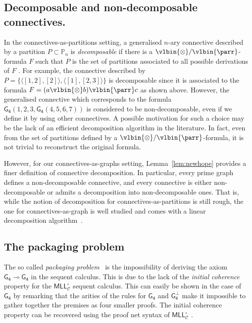 \documentclass{lmcs} %
\def\limp{\multimap}
\def\set#1{\{#1\}}
\def\cneg#1{{#1^\bot}}
\def\lpar{\vlbin{\parr}}
\def\ltens{\vlbin{\otimes}}
\def\MLL{\mathsf{MLL}}
\theoremstyle{plain}
\def\gcon{\mathsf{G_4}}
\def\ngcon{\mathsf{\cneg{G_4}}}
\def\partition#1{\langle #1\rangle}
\def\block#1{[#1]}
\def\partof#1{\mathbb P_{#1}}
\def\partofn{\partof n}
\def\MLLgen{\MLL^\circ_{\mathcal C}}
\begin{document}
\subsection*{Decomposable and non-decomposable connectives.}

In the connectives-as-partitions setting, a generalised $n$-ary connective described by a partition $P\subset\partofn$ is \emph{decomposable} if there is a $\ltens/\lpar$-formula $F$ such that $P$ is 
the set of partitions associated to all possible derivations of $F$ \cite{danos:regnier:89,acc:mai:20}.
For example, the connective described by $P=\set{\partition{\block{1,2},\block 2}, \partition{\block 1, \block{2,3}}}$ 
is decomposable since it is associated to the formula $F=(a\ltens b) \lpar c$ as shown above. %
However, the generalised connective which corresponds  to the formula $\gcon(1,2,3,\gcon(4,5,6,7))$ is considered to be non-decomposable, even if we define it by using other connectives.
A possible motivation for such a choice may be the lack of an efficient decomposition algorithm in the literature.
In fact, even from the set of partitions defined by a $\ltens/\lpar$-formula, it is not trivial to reconstruct the original formula.

However, for our connectives-as-graphs setting,
Lemma~\ref{lem:newhope} provides a finer definition of connective decomposition. 
In particular, every prime graph defines a non-decomposable connective, and every connective is either non-decomposable or admits a decomposition into non-decomposable ones.
That is, while  the notion of decomposition for connectives-as-partitions is still rough, the one for connectives-as-graph is well studied and comes with a linear decomposition algorithm~\cite{LinearModularDecomposition}.

\subsection*{The packaging problem}

The so called \emph{packaging problem}~\cite{danos:regnier:89} is the impossibility of deriving the axiom $\gcon \limp \gcon$ in the sequent calculus. This is due to the lack of the \emph{initial coherence} property  \cite{avr:canonical:01,mil:pim:13} for the $\MLLgen$ sequent calculus.
This can easily be shown in the case of $\gcon$ by remarking that the arities of the rules for $\gcon$ and $\ngcon$ make it impossible to gather together the premises as four smaller proofs.
The initial coherence property can be recovered using the proof net syntax of $\MLLgen$ \cite{acc:mai:20}.
\end{document}
